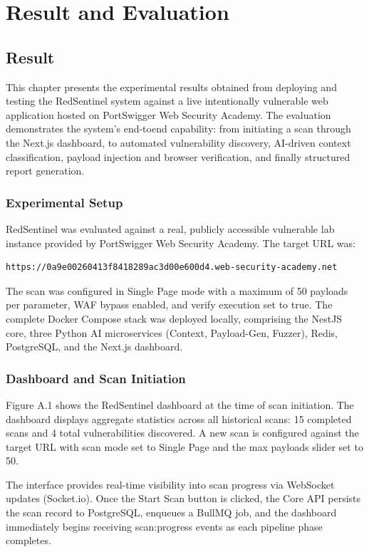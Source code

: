 \chapter{Result and Evaluation}
\section{Result}
This chapter presents the experimental results obtained from deploying and testing the
RedSentinel system against a live intentionally vulnerable web application hosted on
PortSwigger Web Security Academy. The evaluation demonstrates the system's end-toend capability: from initiating a scan through the Next.js dashboard, to automated
vulnerability discovery, AI-driven context classification, payload injection and browser
verification, and finally structured report generation.
\subsection{Experimental Setup}
RedSentinel was evaluated against a real, publicly accessible vulnerable lab instance provided by PortSwigger Web Security Academy. The target URL was:
\smallskip
\begin{Verbatim}[fontsize=\footnotesize]
  https://0a9e00260413f8418289ac3d00e600d4.web-security-academy.net  
\end{Verbatim}
\smallskip
The scan was configured in Single Page mode with a maximum of 50 payloads per parameter, WAF bypass enabled, and verify execution set to true. The complete Docker Compose stack was deployed locally, comprising the NestJS core, three Python AI microservices (Context, Payload-Gen, Fuzzer), Redis, PostgreSQL, and the Next.js dashboard.

\subsection{Dashboard and Scan Initiation}
Figure A.1 shows the RedSentinel dashboard at the time of scan initiation. The dashboard
displays aggregate statistics across all historical scans: 15 completed scans and 4 total
vulnerabilities discovered. A new scan is configured against the target URL with scan
mode set to Single Page and the max payloads slider set to 50.


The interface provides real-time visibility into scan progress via WebSocket updates
(Socket.io). Once the Start Scan button is clicked, the Core API persists the scan record
to PostgreSQL, enqueues a BullMQ job, and the dashboard immediately begins receiving
scan:progress events as each pipeline phase completes.

